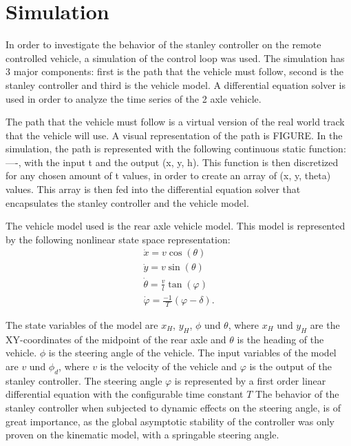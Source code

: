 \documentclass[arbeit=studie,oneside,BCOR=12mm]{ArbeitRST}
\begin{document}
\section{Simulation}
In order to investigate the behavior of the stanley controller on the remote
controlled vehicle, a simulation of the control loop was used. The simulation
has 3 major components: first is the path that the vehicle must follow, second
is the stanley controller and third is the vehicle model. A differential
equation solver is used in order to analyze the time series of the 2 axle
vehicle. 

The path that the vehicle must follow is a virtual version of the real world
track that the vehicle will use. A visual representation of the path is FIGURE.
In the simulation, the path is represented with the following continuous static
function: ----, with the input t and the output (x, y, h). This function is
then discretized for any chosen amount of t values, in order to create an array
of (x, y, theta) values. This array is then fed into the differential equation
solver that encapsulates the stanley controller and the vehicle model. 

The vehicle model used is the rear axle vehicle model. This model is
represented by the following nonlinear state space representation: 
\begin{gather}
    \dot{x} = v \cos(\theta) \\
    \dot{y} = v \sin(\theta) \\
    \dot{\theta} = \frac{v}{l}\tan(\varphi) \\
    \dot{\varphi} = \frac{-1}{T}\left(\varphi - \delta\right).
\end{gather}

The state variables of the model are $x_H$, $y_H$, $\phi$ und $\theta$, where
$x_H$ und $y_H$ are the XY-coordinates of the midpoint of the rear axle and
$\theta$ is the heading of the vehicle. $\phi$ is the steering angle of the
vehicle. The input variables of the model are $v$ und $\phi_d$, where $v$ is
the velocity of the vehicle and $\varphi$ is the output of the stanley controller.
The steering angle $\varphi$ is represented by a first order linear differential
equation with the configurable time constant $T$  The behavior of the stanley
controller when subjected to dynamic effects on the steering angle, is of great
importance, as the global asymptotic stability of the controller was only
proven on the kinematic model, with a springable steering angle. 
\end{document}
